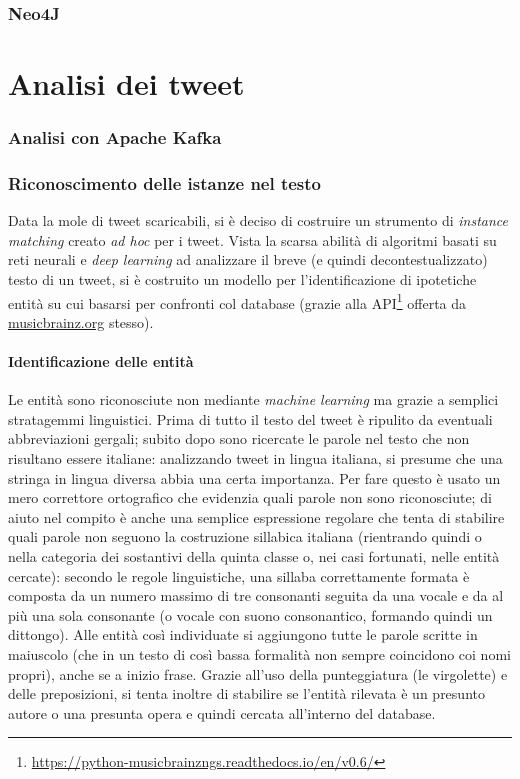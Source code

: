 \documentclass[12pt, a4paper, twocolumn]{article} %
\begin{document}
\section{Neo4J}


\hfill
\newpage
\part{Analisi dei tweet}
\section{Analisi con Apache Kafka}
\section{Riconoscimento delle istanze nel testo}
Data la mole di tweet scaricabili, si è deciso di costruire un strumento di \textit{instance matching} creato \textit{ad hoc} per i tweet.
Vista la scarsa abilità di algoritmi basati su reti neurali e \textit{deep learning} ad analizzare il breve (e quindi decontestualizzato) testo di un tweet, si è costruito un modello per l'identificazione di ipotetiche entità su cui basarsi per confronti col database (grazie alla API\footnote{\url{https://python-musicbrainzngs.readthedocs.io/en/v0.6/}} offerta da \url{musicbrainz.org} stesso).

\subsection{Identificazione delle entità}
Le entità sono riconosciute non mediante \textit{machine learning} ma grazie a semplici stratagemmi linguistici.
Prima di tutto il testo del tweet è ripulito da eventuali abbreviazioni gergali; subito dopo sono ricercate le parole nel testo che non risultano essere italiane: analizzando tweet in lingua italiana, si presume che una stringa in lingua diversa abbia una certa importanza.
Per fare questo è usato un mero correttore ortografico che evidenzia quali parole non sono riconosciute; di aiuto nel compito è anche una semplice espressione regolare che tenta di stabilire quali parole non seguono la costruzione sillabica italiana (rientrando quindi o nella categoria dei sostantivi della quinta classe o, nei casi fortunati, nelle entità cercate): secondo le regole linguistiche, una sillaba correttamente formata è composta da un numero massimo di tre consonanti seguita da una vocale e da al più una sola consonante (o vocale con suono consonantico, formando quindi un dittongo).
Alle entità così individuate si aggiungono tutte le parole scritte in maiuscolo (che in un testo di così bassa formalità non sempre coincidono coi nomi propri), anche se a inizio frase.
Grazie all'uso della punteggiatura (le virgolette) e delle preposizioni, si tenta inoltre di stabilire se l'entità rilevata è un presunto autore o una presunta opera e quindi cercata all'interno del database.
\end{document}
